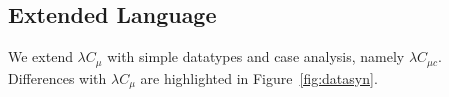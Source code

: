 \newcommand{\Nat}{\mathsf{Nat}} \newcommand{\zero}{\mathsf{zero}}
\newcommand{\suc}{\mathsf{suc}} \newcommand{\plus}{\mathsf{plus}}
\newcommand{\List}{\mathsf{List}} \newcommand{\nil}{\mathsf{nil}}
\newcommand{\cons}{\mathsf{cons}}
\newcommand{\length}{\mathsf{length}}
\newcommand{\PlFunc}{\Nat\rightarrow\Nat\rightarrow\Nat}
\newcommand{\case}{\mathbf{case}} \newcommand{\of}{\mathbf{of}}
\newcommand{\data}{\mathbf{data}} \newcommand{\where}{\mathbf{where}}
\newcommand{\letbb}{\mathbf{let}} \newcommand{\inb}{\mathbf{in}}

\subsection{Extended Language}

We extend $\lambda C_{\mu}$ with simple datatypes and case analysis,
namely $\lambda C_{\mu c}$. Differences with $\lambda C_{\mu}$ are
highlighted in Figure~\ref{fig:datasyn}.

